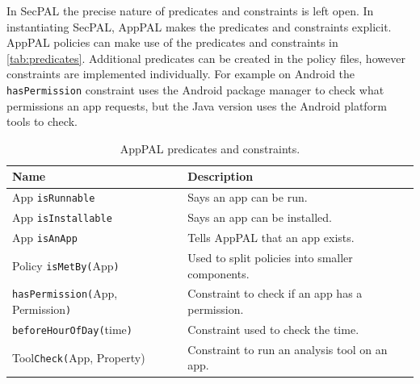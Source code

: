 \documentclass[]{llncs}
\begin{document}
In SecPAL the precise nature of predicates and constraints is left open.
In instantiating SecPAL, AppPAL makes the predicates and constraints explicit.
AppPAL policies can make use of the predicates and constraints in \autoref{tab:predicates}.
Additional predicates can be created in the policy files, however constraints are implemented individually.
For example on Android the \texttt{hasPermission} constraint uses the Android package manager to check what permissions an app requests, but the Java version uses the Android platform tools to check.

\begin{table}
  \footnotesize
  \newcommand{\style}[1]{{\footnotesize #1}}
  \begin{tabulary}{\linewidth}{l L}
  \toprule
  \style{Name}                                             & \style{Description}                                                                                                                        \\
  \midrule
  \style{App \texttt{isRunnable}}                          & \style{Says an app can be run.}                                                                                                            \\
  \style{App \texttt{isInstallable}                      } & \style{Says an app can be installed.                                                                                                     } \\
  \style{App \texttt{isAnApp}                            } & \style{Tells AppPAL that an app exists.                                                                                                  } \\
  \style{Policy \texttt{isMetBy(}App\texttt{)}           } & \style{Used to split policies into smaller components.}                                                                                    \\
  \style{\texttt{hasPermission(}App, Permission\texttt{)}} & \style{Constraint to check if an app has a permission.                                                                                   } \\
  \style{\texttt{beforeHourOfDay(}time\texttt{)}         } & \style{Constraint used to check the time.                                                                                                } \\
  \style{Tool\texttt{Check(}App, Property)               } & \style{Constraint to run an analysis tool on an app.                                                                        }              \\
  \bottomrule
\end{tabulary}
\caption{AppPAL predicates and constraints.}
\label{tab:predicates}
\end{table}
\end{document}
